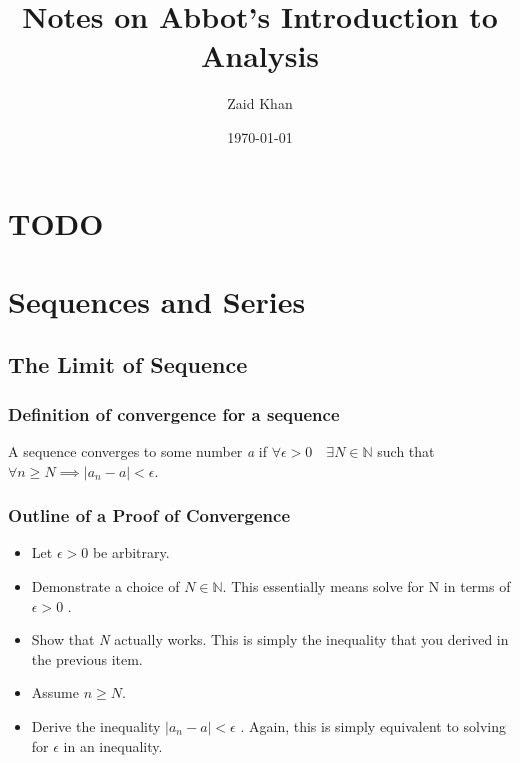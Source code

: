 \documentclass{article}
\title{Notes on Abbot's Introduction to Analysis}
\author{Zaid Khan}
\date{\today}
\begin{document}
\maketitle
\clearpage

\tableofcontents


\clearpage


\section{TODO}


\section{Sequences and Series}
\subsection{The Limit of  Sequence}
\subsubsection{Definition of convergence for a sequence}
A sequence converges to some number \textit{a} if \begin{math} \forall \epsilon > 0 \quad \exists N \in \mathbb{N} \end{math} such that \begin{math} \forall n \geq N \implies | a_{n} - a | < \epsilon     \end{math}.

\subsubsection{Outline of a Proof of Convergence}


\begin{itemize}

\item Let \( \epsilon > 0\) be arbitrary.

\item Demonstrate a choice of \( N \in \mathbb{N} \). This essentially means solve for N in terms of \( \epsilon > 0 \) .

\item Show that \textit{N} actually works. This is simply the inequality that you derived in the previous item.

\item Assume \( n \geq N \).

\item Derive the inequality \( | a_{n}  - a | < \epsilon    \) . Again, this is simply equivalent to solving for \( \epsilon \) in an inequality.


\end{itemize}
\end{document}
